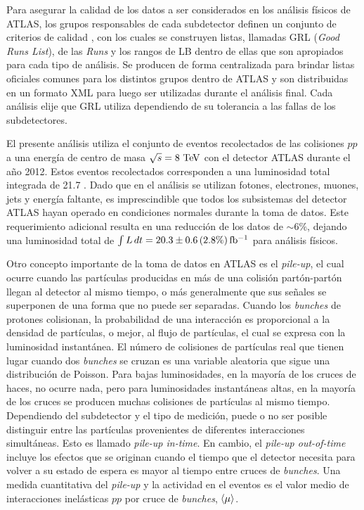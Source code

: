 Para asegurar la calidad de los datos a ser considerados en los análisis físicos
de ATLAS, los grupos responsables de cada subdetector definen un conjunto de
criterios de calidad \cite{GRL}, con los cuales se construyen listas, llamadas
GRL (\emph{Good Runs List}), de las \emph{Runs} y los rangos de LB dentro de ellas que
son apropiados para cada tipo de análisis. Se producen de forma centralizada
para brindar listas oficiales comunes para los distintos grupos dentro de ATLAS
y son distribuidas en un formato \textsc{XML} para luego ser utilizadas durante
el análisis final. Cada análisis elije que GRL utiliza dependiendo de su
tolerancia a las fallas de los subdetectores.

El presente análisis utiliza el conjunto de eventos recolectados de las colisiones
$pp$ a una energía de centro de masa $\sqrt{s} = 8\tev$ con el detector ATLAS
durante el a\~no 2012. Estos eventos recolectados corresponden a una luminosidad
total integrada de 21.7 \ifb. Dado que en el análisis se utilizan fotones, electrones,
muones, jets y energía faltante, es imprescindible que todos los subsistemas
del detector ATLAS hayan operado en condiciones normales durante la toma
de datos. Este requerimiento adicional resulta en una reducción de los datos de
$\sim 6\%$, dejando una luminosidad total de $\int L\, dt = 20.3 \pm 0.6\, (2.8
\%) \, \mbox{fb$^{-1}$}$\cite{lumi2012} para análisis físicos.

Otro concepto importante de la toma de datos en ATLAS es el \emph{pile-up}, el
cual ocurre cuando las partículas producidas en más de una colisión
partón-partón llegan al detector al mismo tiempo, o más generalmente que sus
señales se superponen de una forma que no puede ser separadas. Cuando los
\emph{bunches} de protones colisionan, la probabilidad de una interacción es
proporcional a la densidad de partículas, o mejor, al flujo de partículas, el
cual se expresa con la luminosidad instantánea. El número de colisiones de
partículas real que tienen lugar cuando dos \emph{bunches} se cruzan es una
variable aleatoria que sigue una distribución de Poisson. Para bajas
luminosidades, en la mayoría de los cruces de haces, no ocurre nada, pero para
luminosidades instantáneas altas, en la mayoría de los cruces se producen muchas
colisiones de partículas al mismo tiempo. Dependiendo del subdetector y el tipo
de medición, puede o no ser posible distinguir entre las partículas provenientes
de diferentes interacciones simultáneas. Esto es llamado \emph{pile-up in-time}.
En cambio, el \emph{pile-up out-of-time} incluye los efectos que se originan
cuando el tiempo que el detector necesita para volver a su estado de espera es
mayor al tiempo entre cruces de \emph{bunches}. Una medida cuantitativa del
\emph{pile-up} y la actividad en el eventos es el valor medio de interacciones
inelásticas $pp$ por cruce de \emph{bunches}, $\langle \mu \rangle$.

